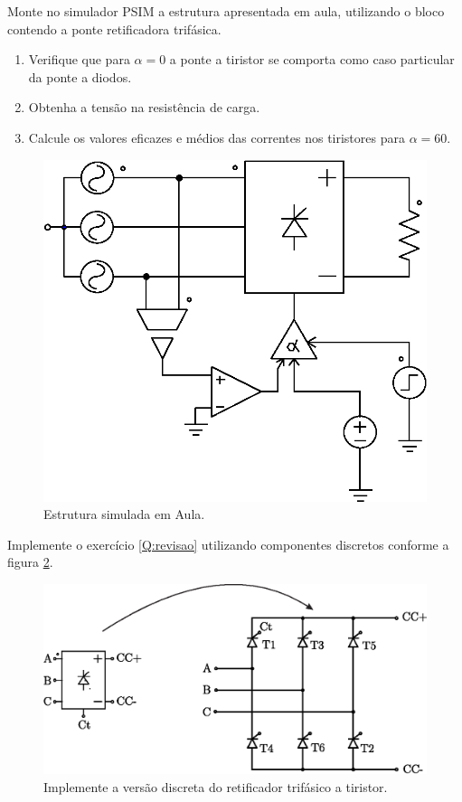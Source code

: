 \documentclass[11pt,paper=a4,answers]{exam}
\begin{document}
		
\begin{questions}
			
\pointsinrightmargin
\pointsdroppedatright
\marksnotpoints
\pointformat{\boldmath\themarginpoints}
\bracketedpoints
			
			
			\question[05]
			\label{Q:revisao}
			
		Monte no simulador PSIM a estrutura apresentada em aula, utilizando o bloco contendo a ponte retificadora trifásica.
						\begin{enumerate}
							\item Verifique que para $\alpha = 0$ a ponte a tiristor se comporta como caso particular da ponte a diodos.
							\item Obtenha a tensão na resistência de carga.
							\item Calcule os valores eficazes e médios das correntes nos tiristores para $\alpha=60$.
						\end{enumerate}
						
		\begin{figure}[!h]
\centering
\includegraphics[width=0.5\linewidth]{figuras/SimularEstruturaBloco}
\caption{Estrutura simulada em Aula.}
\label{fig:SimularEstruturaBloco}
\end{figure}
		
			\droppoints
		
		
		
		
		
			
			\question[06]
			\label{Q:perunit}
Implemente o exercício \ref{Q:revisao} utilizando componentes discretos conforme a figura \ref{fig:TiristorDiscreto}.

\begin{figure}[!h]
\centering
\includegraphics[width=0.7\linewidth]{figuras/TiristorDiscreto}
\caption{Implemente a versão discreta do retificador trifásico a tiristor.}
\label{fig:TiristorDiscreto}
\end{figure}


\end{questions}
\end{document}
